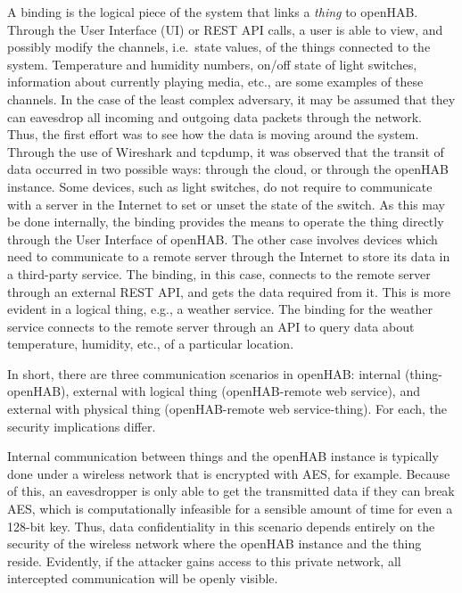 \documentclass[12pt]{article}
\begin{document}
A binding is the logical piece of the system that links a \emph{thing} to openHAB. Through the User Interface (UI) or REST API calls, a user is able to view, and possibly modify the channels, i.e.\ state values, of the things connected to the system. Temperature and humidity numbers, on/off state of light switches, information about currently playing media, etc., are some examples of these channels. In the case of the least complex adversary, it may be assumed that they can eavesdrop all incoming and outgoing data packets through the network. Thus, the first effort was to see how the data is moving around the system. Through the use of Wireshark and tcpdump, it was observed that the transit of data occurred in two possible ways: through the cloud, or through the openHAB instance. Some devices, such as light switches, do not require to communicate with a server in the Internet to set or unset the state of the switch. As this may be done internally, the binding provides the means to operate the thing directly through the User Interface of openHAB. The other case involves devices which need to communicate to a remote server through the Internet to store its data in a third-party service. The binding, in this case, connects to the remote server through an external REST API, and gets the data required from it. This is more evident in a logical thing, e.g., a weather service. The binding for the weather service connects to the remote server through an API to query data about temperature, humidity, etc., of a particular location.

In short, there are three communication scenarios in openHAB: internal (thing-openHAB), external with logical thing (openHAB-remote web service), and external with physical thing (openHAB-remote web service-thing). For each, the security implications differ.

Internal communication between things and the openHAB instance is typically done under a wireless network that is encrypted with AES, for example. Because of this, an eavesdropper is only able to get the transmitted data if they can break AES, which is computationally infeasible for a sensible amount of time for even a 128-bit key. Thus, data confidentiality in this scenario depends entirely on the security of the wireless network where the openHAB instance and the thing reside. Evidently, if the attacker gains access to this private network, all intercepted communication will be openly visible.
\end{document}
